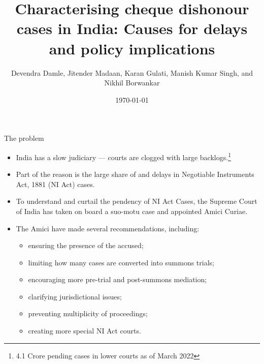 \documentclass[10pt,aspectratio=169]{beamer}
\title{Characterising cheque dishonour cases in India: Causes for delays and policy implications}
\author{Devendra Damle, Jitender Madaan, Karan Gulati, Manish Kumar Singh, and Nikhil Borwankar}
\date{\today}
\begin{document}
\frame{\maketitle}

\begin{frame}{The problem}
\begin{itemize}
 \item India has a slow judiciary --- courts are clogged with large backlogs.\footnote{4.1 Crore pending cases in lower courts as of March 2022}
 \item Part of the reason is the large share of and delays in Negotiable Instruments Act, 1881 (NI Act) cases.
 \item To understand and curtail the pendency of NI Act Cases, the Supreme Court of India has taken on board a suo-motu case and appointed Amici Curiae.
 \item The Amici have made several recommendations, including:
 \begin{itemize}
 \item ensuring the presence of the accused;
 \item limiting how many cases are converted into summons trials;
 \item encouraging more pre-trial and post-summons mediation;
 \item clarifying jurisdictional issues;
 \item preventing multiplicity of proceedings;
 \item creating more special NI Act courts.
 \end{itemize}
\end{itemize}
\end{frame}
\end{document}
